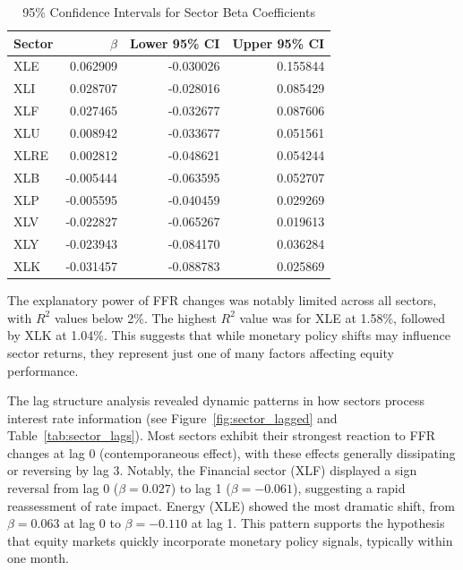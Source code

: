 \documentclass[12pt, stu, abstract]{apa7}
\begin{document}
\begin{table}[htbp]
\centering
\caption{95\% Confidence Intervals for Sector Beta Coefficients}
\label{tab:sector_ci}
\begin{tabular}{lrrr}
\toprule
Sector & $\beta$ & Lower 95\% CI & Upper 95\% CI \\
\midrule
XLE & 0.062909 & -0.030026 & 0.155844 \\
XLI & 0.028707 & -0.028016 & 0.085429 \\
XLF & 0.027465 & -0.032677 & 0.087606 \\
XLU & 0.008942 & -0.033677 & 0.051561 \\
XLRE & 0.002812 & -0.048621 & 0.054244 \\
XLB & -0.005444 & -0.063595 & 0.052707 \\
XLP & -0.005595 & -0.040459 & 0.029269 \\
XLV & -0.022827 & -0.065267 & 0.019613 \\
XLY & -0.023943 & -0.084170 & 0.036284 \\
XLK & -0.031457 & -0.088783 & 0.025869 \\
\bottomrule
\end{tabular}
\end{table}

The explanatory power of FFR changes was notably limited across all sectors, with $R^2$ values below 2\%. The highest $R^2$ value was for XLE at 1.58\%, followed by XLK at 1.04\%. This suggests that while monetary policy shifts may influence sector returns, they represent just one of many factors affecting equity performance.

The lag structure analysis revealed dynamic patterns in how sectors process interest rate information (see Figure~\ref{fig:sector_lagged} and Table~\ref{tab:sector_lags}). Most sectors exhibit their strongest reaction to FFR changes at lag 0 (contemporaneous effect), with these effects generally dissipating or reversing by lag 3. Notably, the Financial sector (XLF) displayed a sign reversal from lag 0 ($\beta = 0.027$) to lag 1 ($\beta = -0.061$), suggesting a rapid reassessment of rate impact. Energy (XLE) showed the most dramatic shift, from $\beta = 0.063$ at lag 0 to $\beta = -0.110$ at lag 1. This pattern supports the hypothesis that equity markets quickly incorporate monetary policy signals, typically within one month.
\end{document}
